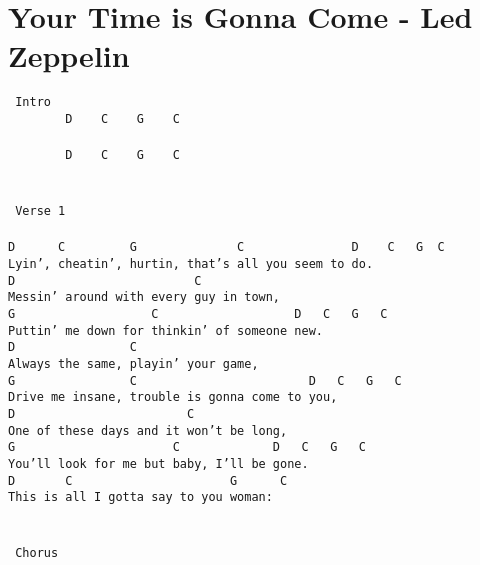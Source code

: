 \newpage
\section{Your Time is Gonna Come - Led Zeppelin}
\label{Your Time is Gonna Come - Led Zeppelin}
\texttt{\lbrack\ Intro\rbrack\ \\
\ \ \ \ \ \ \ \ D\ \ \ \ C\ \ \ \ G\ \ \ \ C\\
\\
\ \ \ \ \ \ \ \ D\ \ \ \ C\ \ \ \ G\ \ \ \ C\\
\\
\\
\lbrack\ Verse\ 1\rbrack\\
\\
D\ \ \ \ \ \ C\ \ \ \ \ \ \ \ \ G\ \ \ \ \ \ \ \ \ \ \ \ \ \ C\ \ \ \ \ \ \ \ \ \ \ \ \ \ \ D\ \ \ \ C\ \ \ G\ \ C\\
Lyin',\ cheatin',\ hurtin,\ that's\ all\ you\ seem\ to\ do.\\
D\ \ \ \ \ \ \ \ \ \ \ \ \ \ \ \ \ \ \ \ \ \ \ \ \ C\\
Messin'\ around\ with\ every\ guy\ in\ town,\\
G\ \ \ \ \ \ \ \ \ \ \ \ \ \ \ \ \ \ \ C\ \ \ \ \ \ \ \ \ \ \ \ \ \ \ \ \ \ \ D\ \ \ C\ \ \ G\ \ \ C\\
Puttin'\ me\ down\ for\ thinkin'\ of\ someone\ new.\\
D\ \ \ \ \ \ \ \ \ \ \ \ \ \ \ \ C\ \\
Always\ the\ same,\ playin'\ your\ game,\\
G\ \ \ \ \ \ \ \ \ \ \ \ \ \ \ \ C\ \ \ \ \ \ \ \ \ \ \ \ \ \ \ \ \ \ \ \ \ \ \ \ D\ \ \ C\ \ \ G\ \ \ C\\
Drive\ me\ insane,\ trouble\ is\ gonna\ come\ to\ you,\\
D\ \ \ \ \ \ \ \ \ \ \ \ \ \ \ \ \ \ \ \ \ \ \ \ C\\
One\ of\ these\ days\ and\ it\ won't\ be\ long,\\
G\ \ \ \ \ \ \ \ \ \ \ \ \ \ \ \ \ \ \ \ \ \ C\ \ \ \ \ \ \ \ \ \ \ \ \ D\ \ \ C\ \ \ G\ \ \ C\\
You'll\ look\ for\ me\ but\ baby,\ I'll\ be\ gone.\\
D\ \ \ \ \ \ \ C\ \ \ \ \ \ \ \ \ \ \ \ \ \ \ \ \ \ \ \ \ \ G\ \ \ \ \ \ C\\
This\ is\ all\ I\ gotta\ say\ to\ you\ woman:\\
\\
\\
\lbrack\ Chorus\rbrack\\
}
